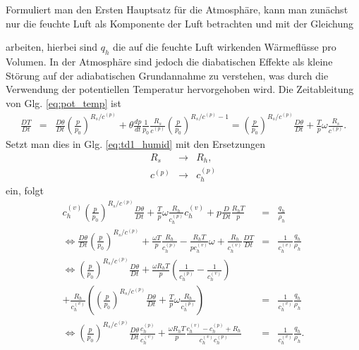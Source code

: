\documentclass{book}
\newcommand{\md}[1]{\frac{D#1}{Dt}}
\begin{document}
Formuliert man den Ersten Hauptsatz für die Atmosphäre, kann man zunächst nur die feuchte Luft als Komponente der Luft betrachten und mit der Gleichung
%
\begin{center}
\doublebox{\parbox{0.8\textwidth}{
\begin{center}
\begin{eqnarray}
c_h^{(v)}\md{T} + p\md{}\frac{1}{\rho_h'} = \frac{q_h}{\rho_h}\label{eq:td1_humid}
\end{eqnarray}
\end{center}
}}
\end{center}
%
arbeiten, hierbei sind $q_h$ die auf die feuchte Luft wirkenden Wärmeflüsse pro Volumen. In der Atmosphäre sind jedoch die diabatischen Effekte als kleine Störung auf der adiabatischen Grundannahme zu verstehen, was durch die Verwendung der potentiellen Temperatur hervorgehoben wird. Die Zeitableitung von Glg. \eqref{eq:pot_temp} ist
%
\begin{eqnarray}
\md{T} & = & \md{\theta}\left(\frac{p}{p_0}\right)^{R_s/c^{(p)}} + \theta\frac{dp}{dt}\frac{1}{p_0}\frac{R_s}{c^{(p)}}\left(\frac{p}{p_0}\right)^{R_s/c^{(p)} - 1} = \left(\frac{p}{p_0}\right)^{R_s/c^{(p)}}\md{\theta} + \frac{T}{p}\omega\frac{R_s}{c^{(p)}}.
\end{eqnarray}
%
Setzt man dies in Glg. \eqref{eq:td1_humid} mit den Ersetzungen
%
\begin{eqnarray}
R_s&\to&R_h,\\
c^{(p)}&\to&c_h^{(p)}
\end{eqnarray}
%
ein, folgt
%
\begin{eqnarray}
c_h^{(v)}\left(\frac{p}{p_0}\right)^{R_s/c^{(p)}}\md{\theta} + \frac{T}{p}\omega\frac{R_h}{c_h^{(p)}}c_h^{(v)} + p\md{}\frac{R_hT}{p} & = & \frac{q_h}{\rho_h}\nonumber\\
\Leftrightarrow \md{\theta}\left(\frac{p}{p_0}\right)^{R_s/c^{(p)}} + \frac{\omega T}{p}\frac{R_h}{c_h^{(p)}} - \frac{R_hT}{pc_h^{(v)}}\omega + \frac{R_h}{c_h^{(v)}}\md{T} & = & \frac{1}{c_h^{(v)}}\frac{q_h}{\rho_h}\nonumber\\
\Leftrightarrow \left(\frac{p}{p_0}\right)^{R_s/c^{(p)}}\md{\theta} + \frac{\omega R_hT}{p}\left(\frac{1}{c_h^{(p)}} - \frac{1}{c_h^{(v)}}\right)\nonumber\\
+ \frac{R_h}{c_h^{(v)}}\left(\left(\frac{p}{p_0}\right)^{R_s/c^{(p)}}\md{\theta} + \frac{T}{p}\omega\frac{R_h}{c_h^{(p)}}\right) & = & \frac{1}{c_h^{(v)}}\frac{q_h}{\rho_h}\nonumber\\
\Leftrightarrow \left(\frac{p}{p_0}\right)^{R_s/c^{(p)}}\md{\theta}\frac{c_h^{(p)}}{c_h^{(v)}} + \frac{\omega R_hT}{p}\frac{c_h^{(v)} - c_h^{(p)} + R_h}{c_h^{(v)}c_h^{(p)}} & = & \frac{1}{c_h^{(v)}}\frac{q_h}{\rho_h}.
\end{eqnarray}
\end{document}
